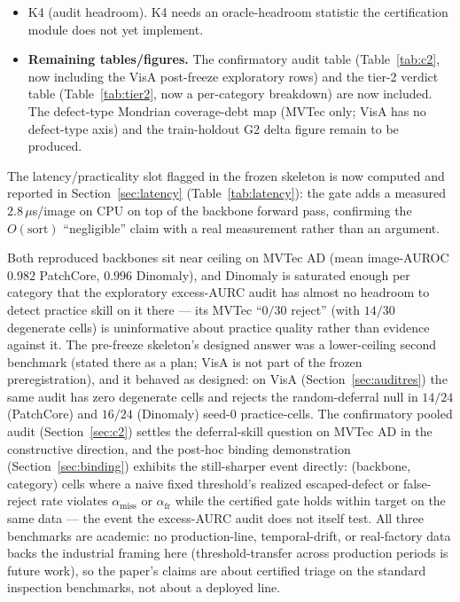 \documentclass[preprint,11pt]{elsarticle}
\newcommand{\todo}[1]{#1}
\begin{document}
\begin{itemize}
        2026-07-11 freeze therefore predates this execution by design; running K6 after the freeze is
        the intended sequencing, not an inconsistency.
  \item K4 (audit headroom).
        \todo{K4 needs an oracle-headroom statistic the certification module does not yet implement.}
  \item \textbf{Remaining tables/figures.} The confirmatory audit table (Table~\ref{tab:c2}, now
        including the VisA post-freeze exploratory rows) and the tier-2 verdict table
        (Table~\ref{tab:tier2}, now a per-category breakdown) are now included.
        \todo{The defect-type Mondrian coverage-debt map (MVTec only; VisA has no defect-type axis)
        and the train-holdout G2 delta figure remain to be produced.}
\end{itemize}

The latency/practicality slot flagged in the frozen skeleton is now computed and reported in
Section~\ref{sec:latency} (Table~\ref{tab:latency}): the gate adds a measured $2.8\,\mu$s/image on
CPU on top of the backbone forward pass, confirming the $O(\text{sort})$ ``negligible'' claim with
a real measurement rather than an argument.

Both reproduced backbones sit near ceiling on MVTec AD (mean image-AUROC $0.982$ PatchCore,
$0.996$ Dinomaly), and Dinomaly is saturated enough per category that the exploratory
excess-AURC audit has almost no headroom to detect practice skill on it there --- its MVTec
``$0/30$ reject'' (with $14/30$ degenerate cells) is uninformative about practice quality rather
than evidence against it. The pre-freeze skeleton's designed answer was a lower-ceiling second
benchmark (stated there as a plan; VisA is not part of the frozen preregistration), and it
behaved as designed: on VisA (Section~\ref{sec:auditres}) the same audit has zero degenerate
cells and rejects the random-deferral null in $14/24$ (PatchCore) and $16/24$ (Dinomaly)
seed-$0$ practice-cells. The confirmatory pooled audit (Section~\ref{sec:c2}) settles the
deferral-skill question on MVTec AD in the constructive direction, and the post-hoc binding
demonstration (Section~\ref{sec:binding}) exhibits the still-sharper event directly:
(backbone, category) cells where a naive fixed threshold's realized escaped-defect or
false-reject rate violates $\alpha_{\text{miss}}$ or $\alpha_{\text{fr}}$ while the certified gate
holds within target on the same data --- the event the excess-AURC audit does not itself test.
All three benchmarks are academic: no production-line, temporal-drift, or real-factory data
backs the industrial framing here (threshold-transfer across production periods is future work),
so the paper's claims are about certified triage on the standard inspection benchmarks, not
about a deployed line.
\end{document}
